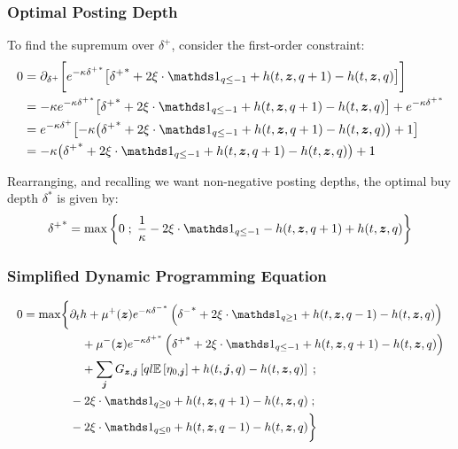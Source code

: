 \begin{frame}
\frametitle{Optimal Posting Depth}
To find the supremum over $\delta^+$, consider the first-order constraint:
\[
\resizebox{\textwidth}{!}{$\displaystyle
\begin{aligned}
0 & = \partial_{\delta^+} \biggl[ e^{ -\kappa {\delta^+}^*} \bigl[ {\delta^+}^* +  2 \xi \cdot \indicator_{q \leq -1} + h(t,\bz,q+1) - h(t,\bz,q) \bigr] \biggr] \\
& = -\kappa e^{ -\kappa {\delta^+}^*} \bigl[ {\delta^+}^* +2 \xi \cdot \indicator_{q \leq -1} + h(t,\bz,q+1) - h(t,\bz,q) \bigr] + e^{ -\kappa {\delta^+}^*} \\
& = e^{ -\kappa \delta^{+}} \bigl[ -\kappa \bigl( {\delta^+}^* +2 \xi \cdot \indicator_{q \leq -1} + h(t,\bz,q+1) - h(t,\bz,q) \bigr) + 1 \bigr] \\
& = -\kappa \bigl( {\delta^+}^* +2 \xi \cdot \indicator_{q \leq -1} + h(t,\bz,q+1) - h(t,\bz,q) \bigr) + 1 \\
\end{aligned}
$}
\]

Rearranging, and recalling we want non-negative posting depths, the optimal buy depth $\delta^*$ is given by:
\[ {\delta^+}^* = \max \left\lbrace 0 \; ; \; \frac{1}{\kappa} - 2 \xi \cdot \indicator_{q \leq -1} - h(t,\bz,q+1) + h(t,\bz,q) \right\rbrace \] 
\end{frame}

\begin{frame}
\frametitle{Simplified Dynamic Programming Equation}
\[
\resizebox{\textwidth}{!}{$\displaystyle
\begin{aligned}
0 = \max \biggl\lbrace & \partial_t h + \mu^+(\bz) e^{ -\kappa {\delta^-}^*} \left( {\delta^-}^* + 2\xi \cdot \indicator_{q \geq 1} + h(t,\bz,q-1) - h(t,\bz,q) \right)  \\
& \quad + \mu^-(\bz) e^{ -\kappa {\delta^+}^*} \left( {\delta^+}^* + 2 \xi \cdot \indicator_{q \leq -1} + h(t,\bz,q+1) - h(t,\bz,q) \right) \\
& \quad + \sum_{\bj} G_{\bz,\bj} \left[ ql \E \left[ \eta_{0,\bj} \right] + h(t,\bj,q) - h(t,\bz,q) \right] \; ; \\
& -2 \xi \cdot \indicator_{q \geq 0} + h(t, \bz, q+1) - h(t,\bz,q)   \; ; \\
& -2 \xi \cdot \indicator_{q \leq 0} + h(t, \bz, q-1) - h(t,\bz,q)  \biggr\rbrace
\end{aligned}
$}
\]
\end{frame}

